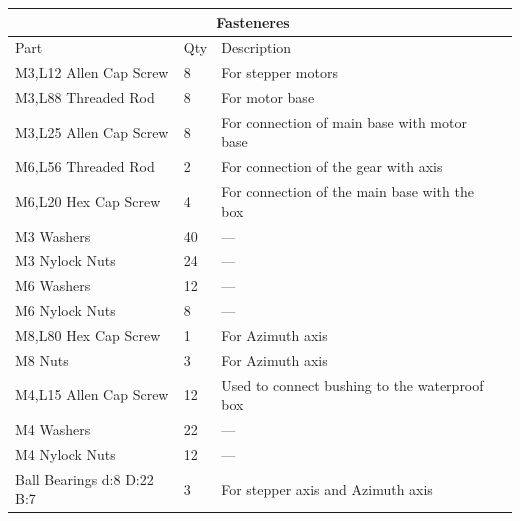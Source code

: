 \documentclass[a4paper]{article}
\begin{document}
\vspace{0.5cm}

\begin{center}
	\begin{tabular}{ | l | l | l | l |}
	\hline
 	\multicolumn{3}{|c|}{Fasteneres} \\
 	\hline
	Part & Qty & Description \\ \hline
	M3,L12 Allen Cap Screw & 8 & For stepper motors \\ \hline
	M3,L88 Threaded Rod & 8 & For motor base \\ \hline
	M3,L25 Allen Cap Screw & 8 & For connection of main base with motor base \\ \hline
 	M6,L56 Threaded Rod & 2 & For connection of the gear with axis \\ \hline
	M6,L20 Hex Cap Screw & 4 & For connection of the main base with the box \\ \hline
	M3 Washers & 40 & --- \\ \hline
	M3 Nylock Nuts & 24 & --- \\ \hline
	M6 Washers & 12 & --- \\ \hline
	M6 Nylock Nuts & 8 & --- \\ \hline
	M8,L80 Hex Cap Screw & 1 & For Azimuth axis \\ \hline
	M8 Nuts & 3 & For Azimuth axis \\ \hline
	M4,L15 Allen Cap Screw & 12 & Used to connect bushing to the waterproof box \\ \hline
	M4 Washers & 22 & --- \\ \hline
	M4 Nylock Nuts & 12 & --- \\ \hline
	Ball Bearings d:8 D:22 B:7 & 3 & For stepper axis and Azimuth axis\\ \hline
    	\end{tabular}
\end{center}

\newpage
\end{document}
